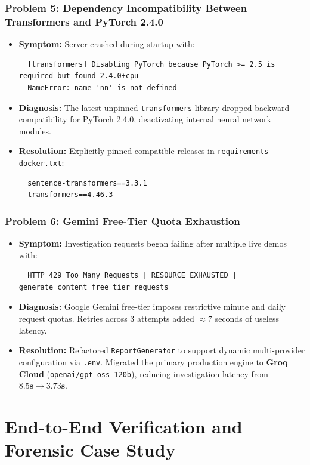 \documentclass[11pt,a4paper]{report}
\begin{document}
\subsection{Problem 5: Dependency Incompatibility Between Transformers and PyTorch 2.4.0}
\begin{itemize}[leftmargin=1.5em]
  \item \textbf{Symptom:} Server crashed during startup with:
  \begin{lstlisting}
  [transformers] Disabling PyTorch because PyTorch >= 2.5 is required but found 2.4.0+cpu
  NameError: name 'nn' is not defined
  \end{lstlisting}
  \item \textbf{Diagnosis:} The latest unpinned \texttt{transformers} library dropped backward compatibility for PyTorch 2.4.0, deactivating internal neural network modules.
  \item \textbf{Resolution:} Explicitly pinned compatible releases in \texttt{requirements-docker.txt}:
  \begin{lstlisting}
  sentence-transformers==3.3.1
  transformers==4.46.3
  \end{lstlisting}
\end{itemize}

\subsection{Problem 6: Gemini Free-Tier Quota Exhaustion}
\begin{itemize}[leftmargin=1.5em]
  \item \textbf{Symptom:} Investigation requests began failing after multiple live demos with:
  \begin{lstlisting}
  HTTP 429 Too Many Requests | RESOURCE_EXHAUSTED | generate_content_free_tier_requests
  \end{lstlisting}
  \item \textbf{Diagnosis:} Google Gemini free-tier imposes restrictive minute and daily request quotas. Retries across 3 attempts added $\approx 7$ seconds of useless latency.
  \item \textbf{Resolution:} Refactored \texttt{ReportGenerator} to support dynamic multi-provider configuration via \texttt{.env}. Migrated the primary production engine to \textbf{Groq Cloud} (\texttt{openai/gpt-oss-120b}), reducing investigation latency from $\mathbf{8.5s \to 3.73s}$.
\end{itemize}

\chapter{End-to-End Verification and Forensic Case Study}
\end{document}
